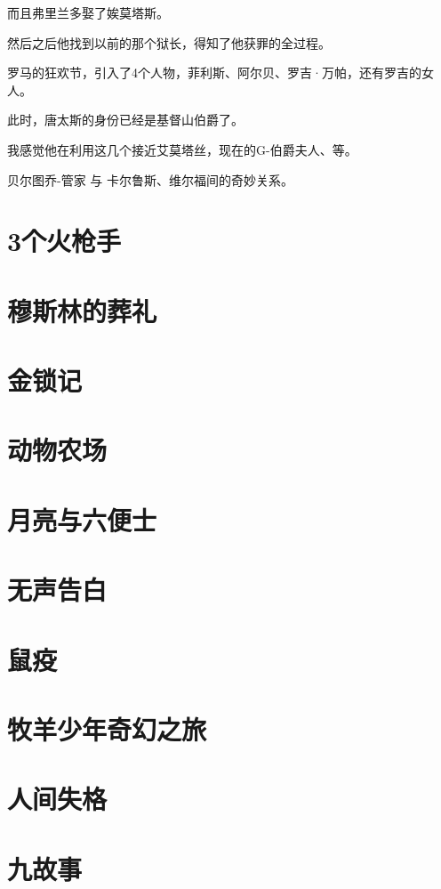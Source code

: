 \documentclass[UTF8,a4paper,12pt]{ctexbook}
\begin{document}
		而且弗里兰多娶了娭莫塔斯。
		
		然后之后他找到以前的那个狱长，得知了他获罪的全过程。
		
		罗马的狂欢节，引入了4个人物，菲利斯、阿尔贝、罗吉·万帕，还有罗吉的女人。
		
		此时，唐太斯的身份已经是基督山伯爵了。
		
		我感觉他在利用这几个接近艾莫塔丝，现在的G-伯爵夫人、等。
		
		贝尔图乔-管家 与 卡尔鲁斯、维尔福间的奇妙关系。
		
	\section{3个火枪手}	
	
	\section{穆斯林的葬礼}
	
	\section{金锁记}
	
	\section{动物农场}
	
	\section{月亮与六便士}
	
	\section{无声告白}
	
	\section{鼠疫}
	
	\section{牧羊少年奇幻之旅}
	
	\section{人间失格}
	
	\section{九故事}
	
\end{document}
